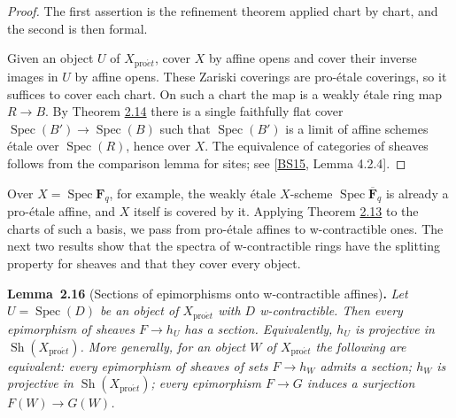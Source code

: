 \documentclass[11pt]{article}
\newenvironment{bpstatement}[2]{\par\addvspace{0.6\baselineskip}\noindent\textbf{#1}#2\textbf{.}\enspace\ignorespaces}
  {\par\addvspace{0.4\baselineskip}}
\newenvironment{bpstatementit}[2]{\begin{bpstatement}{#1}{#2}\itshape\ignorespaces}{\end{bpstatement}}
\providecommand{\Sh}{}\renewcommand{\Sh}{\operatorname{Sh}}
\begin{document}
\begin{proof}[{Proof}]\label{bp47}%
The first assertion is the refinement theorem applied chart by chart, and the second is then formal.

Given an object \(U\) of \(X_{\mathrm{pro}\acute{e}t}\), cover \(X\) by affine opens and cover their inverse images in \(U\) by affine opens. These Zariski coverings are pro-étale coverings, so it suffices to cover each chart. On such a chart the map is a weakly étale ring map \(R\to B\). By Theorem \hyperref[bp42]{2.14} there is a single faithfully flat cover \(\operatorname{Spec}(B')\to\operatorname{Spec}(B)\) such that \(\operatorname{Spec}(B')\) is a limit of affine schemes étale over \(\operatorname{Spec}(R)\), hence over \(X\). The equivalence of categories of sheaves follows from the comparison lemma for sites; see [\hyperref[bp705]{BS15}, Lemma 4.2.4].
\end{proof}

\label{bp48}%
Over \(X=\operatorname{Spec}\mathbf F_q\), for example, the weakly étale \(X\)-scheme \(\operatorname{Spec}\overline{\mathbf F}_q\) is already a pro-étale affine, and \(X\) itself is covered by it. Applying Theorem \hyperref[bp39]{2.13} to the charts of such a basis, we pass from pro-étale affines to w-contractible ones. The next two results show that the spectra of w-contractible rings have the splitting property for sheaves and that they cover every object.

\label{bp49}%
\begin{bpstatementit}{Lemma~2.16}{ (Sections of epimorphisms onto w-contractible affines)}
Let \(U=\operatorname{Spec}(D)\) be an object of \(X_{\mathrm{pro}\acute{e}t}\) with \(D\) w-contractible. Then every epimorphism of sheaves \(F\to h_U\) has a section. Equivalently, \(h_U\) is projective in \(\Sh(X_{\mathrm{pro}\acute{e}t})\). More generally, for an object \(W\) of \(X_{\mathrm{pro}\acute{e}t}\) the following are equivalent: every epimorphism of sheaves of sets \(F\to h_W\) admits a section; \(h_W\) is projective in \(\Sh(X_{\mathrm{pro}\acute{e}t})\); every epimorphism \(F\to G\) induces a surjection \(F(W)\to G(W)\).
\end{bpstatementit}
\end{document}
